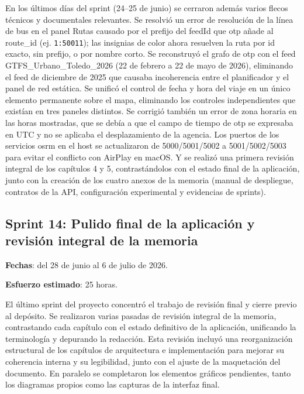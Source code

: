 En los últimos días del sprint (24--25 de junio) se cerraron además varios flecos técnicos y documentales relevantes. Se resolvió un error de resolución de la línea de bus en el panel Rutas causado por el prefijo del feedId que \gls{otp} añade al route\_id (ej. \texttt{1:50011}); las insignias de color ahora resuelven la ruta por id exacto, sin prefijo, o por nombre corto. Se reconstruyó el grafo de \gls{otp} con el feed GTFS\_Urbano\_Toledo\_2026 (22 de febrero a 22 de mayo de 2026), eliminando el feed de diciembre de 2025 que causaba incoherencia entre el planificador y el panel de red estática. Se unificó el control de fecha y hora del viaje en un único elemento permanente sobre el mapa, eliminando los controles independientes que existían en tres paneles distintos. Se corrigió también un error de zona horaria en las horas mostradas, que se debía a que el campo de tiempo de \gls{otp} se expresaba en UTC y no se aplicaba el desplazamiento de la agencia. Los puertos de los servicios \gls{osrm} en el host se actualizaron de 5000/5001/5002 a 5001/5002/5003 para evitar el conflicto con AirPlay en macOS. Y se realizó una primera revisión integral de los capítulos 4 y 5, contrastándolos con el estado final de la aplicación, junto con la creación de los cuatro anexos de la memoria (manual de despliegue, contratos de la API, configuración experimental y evidencias de sprints).
\newpage
\subsection{Sprint 14: Pulido final de la aplicación y revisión integral de la memoria}

\textbf{Fechas}: del 28 de junio al 6 de julio de 2026.

\textbf{Esfuerzo estimado}: 25 horas.\newline

El último sprint del proyecto concentró el trabajo de revisión final y cierre previo al depósito. Se realizaron varias pasadas de revisión integral de la memoria, contrastando cada capítulo con el estado definitivo de la aplicación, unificando la terminología y depurando la redacción. Esta revisión incluyó una reorganización estructural de los capítulos de arquitectura e implementación para mejorar su coherencia interna y su legibilidad, junto con el ajuste de la maquetación del documento. En paralelo se completaron los elementos gráficos pendientes, tanto los diagramas propios como las capturas de la interfaz final.\newline

